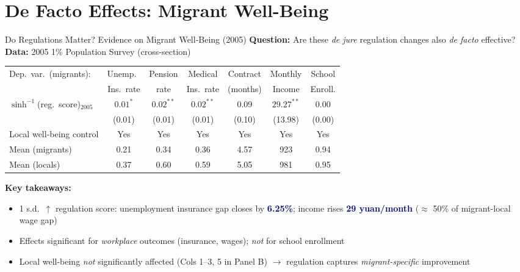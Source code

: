 \documentclass[10pt,aspectratio=169,t]{beamer}
\newcommand{\hlight}[1]{\textcolor{darkblue}{\textbf{#1}}}
\newcommand{\gmark}[1]{\textcolor{resultgreen}{#1}}
\newcommand{\asinh}{\operatorname{sinh}^{-1}}
\begin{document}
\section{De Facto Effects: Migrant Well-Being}

\begin{frame}{Do Regulations Matter? Evidence on Migrant Well-Being (2005)}
\textbf{Question:} Are these \textit{de jure} regulation changes also \textit{de facto} effective?\\[3pt]
\textbf{Data:} 2005 1\% Population Survey (cross-section)

\begin{table}[h]
\centering\footnotesize
\setlength{\tabcolsep}{3pt}
\begin{tabular}{@{}lcccccc@{}}
\toprule
Dep.\ var.\ (migrants): & Unemp.\ & Pension & Medical & Contract & Monthly & School \\
& Ins.\ rate & rate & Ins.\ rate & (months) & Income & Enroll. \\
\midrule
$\asinh$(reg.\ score)$_{2005}$ & $0.01^*$ & $0.02^{**}$ & $0.02^{**}$ & 0.09 & $29.27^{**}$ & 0.00 \\
& (0.01) & (0.01) & (0.01) & (0.10) & (13.98) & (0.00) \\[3pt]
Local well-being control & \gmark{Yes} & \gmark{Yes} & \gmark{Yes} & \gmark{Yes} & \gmark{Yes} & \gmark{Yes} \\
\midrule
Mean (migrants) & 0.21 & 0.34 & 0.36 & 4.57 & 923 & 0.94 \\
Mean (locals) & 0.37 & 0.60 & 0.59 & 5.05 & 981 & 0.95 \\
\bottomrule
\end{tabular}
\end{table}

\medskip
\textbf{Key takeaways:}
\begin{itemize}
    \item 1 s.d.\ $\uparrow$ regulation score: unemployment insurance gap closes by \hlight{6.25\%}; income rises \hlight{29 yuan/month} ($\approx$ 50\% of migrant-local wage gap)
    \item Effects significant for \textit{workplace} outcomes (insurance, wages); \textit{not} for school enrollment
    \item Local well-being \textit{not} significantly affected (Cols 1--3, 5 in Panel B) $\rightarrow$ regulation captures \textit{migrant-specific} improvement
\end{itemize}
\end{frame}
\end{document}
